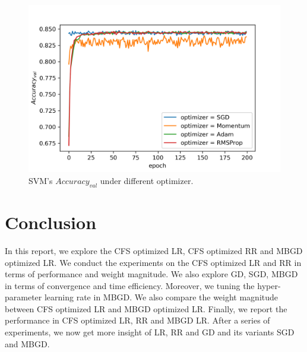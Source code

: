 \documentclass[journal, a4paper]{IEEEtran}
\begin{document}
\begin{figure}[!hbt]
	\begin{center}
		\includegraphics[width=\columnwidth]{svm_optim_val_acc}
		\caption{SVM's $Accuracy_{val}$ under different optimizer.}
		\label{fig:svm_optim_val_acc}
	\end{center}
\end{figure} \par


\section{Conclusion}
In this report, we explore the CFS optimized LR, CFS optimized RR and MBGD optimized LR. We conduct the experiments on the CFS optimized LR and RR in terms of performance and weight magnitude. We also explore GD, SGD, MBGD in terms of convergence and time efficiency. Moreover, we tuning the hyper-parameter learning rate in MBGD. We also compare the weight magnitude between CFS optimized LR and MBGD optimized LR. Finally, we report the performance in CFS optimized LR, RR and MBGD LR. After a series of experiments, we now get more insight of LR, RR and GD and its variants SGD and MBGD. \par



\end{document}
